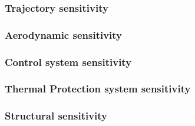 
\subsubsection{Trajectory sensitivity}\label{subsec:orbitsens}


\subsubsection{Aerodynamic sensitivity}\label{subsec:aerosens}


\subsubsection{Control system sensitivity}\label{subsec:controlsens}


\subsubsection{Thermal Protection system sensitivity}\label{subsec:thermalsens}


\subsubsection{Structural sensitivity}\label{subsec:strucsens}






